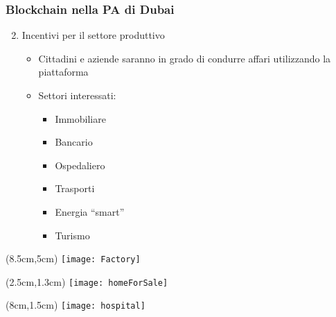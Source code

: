 \begin{frame}
 \frametitle{Blockchain nella PA di Dubai}

 \begin{enumerate}
 \setcounter{enumi}{1}
  \item<1-> Incentivi per il settore produttivo
  \begin{itemize}
   \item<2-> Cittadini e aziende saranno in grado di condurre affari
utilizzando la piattaforma
   \item<3-> Settori interessati:
   \begin{itemize}
    \item Immobiliare
    \item Bancario
    \item Ospedaliero
    \item Trasporti
    \item Energia ``smart''
    \item Turismo

   \end{itemize}

  \end{itemize}

 \end{enumerate}
 
 
 \begin{textblock*}{5cm}(8.5cm,5cm)
  \texttt{[image: Factory]}
 \end{textblock*}
 
  
 \begin{textblock*}{5cm}(2.5cm,1.3cm)
  \texttt{[image: homeForSale]}
 \end{textblock*}
 
 \begin{textblock*}{5cm}(8cm,1.5cm)
  \texttt{[image: hospital]}
 \end{textblock*}

\end{frame}

